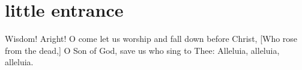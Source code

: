 \section{little entrance}

\begin{liturgicaltext}
    \deacon Wisdom! Aright!
    \choir O come let us worship and fall down before Christ, [Who rose from the dead,] O Son of God, save us who sing to Thee: Alleluia, alleluia, alleluia.
\end{liturgicaltext}